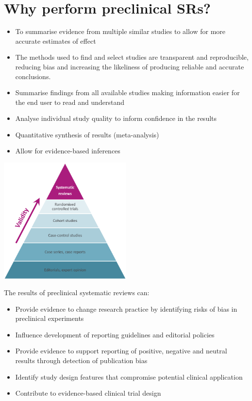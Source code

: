 \documentclass[
]{book}
\providecommand{\tightlist}{%
  \setlength{\itemsep}{0pt}\setlength{\parskip}{0pt}}
\begin{document}
\hypertarget{why-perform-preclinical-srs}{%
\section{Why perform preclinical SRs?}\label{why-perform-preclinical-srs}}

\begin{itemize}
\tightlist
\item
  To summarise evidence from multiple similar studies to allow for more accurate estimates of effect
\item
  The methods used to find and select studies are transparent and reproducible, reducing bias and increasing the likeliness of producing reliable and accurate conclusions.
\item
  Summarise findings from all available studies making information easier for the end user to read and understand
\item
  Analyse individual study quality to inform confidence in the results
\item
  Quantitative synthesis of results (meta-analysis)
\item
  Allow for evidence-based inferences
\end{itemize}

\includegraphics[width=0.5\textwidth,height=0.5\textheight]{figs/evidence-triangle.png}

The results of preclinical systematic reviews can:

\begin{itemize}
\tightlist
\item
  Provide evidence to change research practice by identifying risks of bias in preclinical experiments
\item
  Influence development of reporting guidelines and editorial policies
\item
  Provide evidence to support reporting of positive, negative and neutral results through detection of publication bias
\item
  Identify study design features that compromise potential clinical application
\item
  Contribute to evidence-based clinical trial design
\end{itemize}
\end{document}
